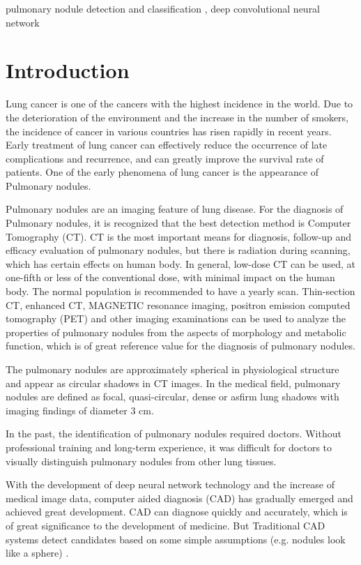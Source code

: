 \documentclass[conference]{IEEEtran}
\begin{document}
\begin{IEEEkeywords}
    pulmonary nodule detection and classification
    , deep convolutional neural network
\end{IEEEkeywords}

\section{Introduction}
Lung cancer is one of the cancers with the highest incidence in the world. Due to the deterioration of the environment and the increase in the number of smokers, the incidence of cancer in various countries has risen rapidly in recent years. Early treatment of lung cancer can effectively reduce the occurrence of late complications and recurrence, and can greatly improve the survival rate of patients. One of the early phenomena of lung cancer is the appearance of Pulmonary nodules.


Pulmonary nodules are an imaging feature of lung disease. For the diagnosis of Pulmonary nodules, it is recognized that the best detection method is Computer Tomography (CT). CT is the most important means for diagnosis, follow-up and efficacy evaluation of pulmonary nodules, but there is radiation during scanning, which has certain effects on human body. In general, low-dose CT can be used, at one-fifth or less of the conventional dose, with minimal impact on the human body. The normal population is recommended to have a yearly scan. Thin-section CT, enhanced CT, MAGNETIC resonance imaging, positron emission computed tomography (PET) and other imaging examinations can be used to analyze the properties of pulmonary nodules from the aspects of morphology and metabolic function, which is of great reference value for the diagnosis of pulmonary nodules.


The pulmonary nodules are approximately spherical in physiological structure and appear as circular shadows in CT images. In the medical field, pulmonary nodules are defined as focal, quasi-circular, dense or asfirm lung shadows with imaging findings of diameter 3 cm.


In the past, the identification of pulmonary nodules required doctors. Without professional training and long-term experience, it was difficult for doctors to visually distinguish pulmonary nodules from other lung tissues.


With the development of deep neural network technology and the increase of medical image data, computer aided diagnosis (CAD) has gradually emerged and achieved great development. CAD can diagnose quickly and accurately, which is of great significance to the development of medicine. But Traditional CAD systems detect candidates based on some simple assumptions (e.g. nodules look like a sphere) \cite{doi:10.1118/1.4907970}.
\end{document}
